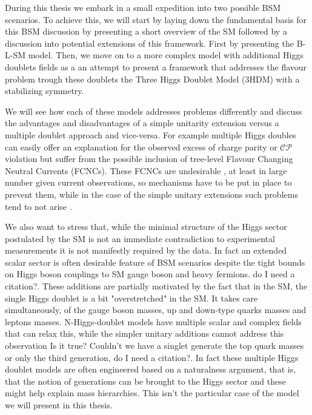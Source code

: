 During this thesis we embark in a small expedition into two possible BSM scenarios.
%
To achieve this, we will start by laying down the fundamental basis for this BSM discussion by presenting a short overview of the SM followed by a discussion into potential extensions of this framework. First by presenting the B-L-SM model. 
%
Then, we move on to a more complex model with additional Higgs doublets fields as
a an attempt to present a framework that addresses the flavour problem trough these doublets the Three Higgs Doublet Model (3HDM) with a stabilizing symmetry.

We will see how each of these models addresses problems differently and discuss the advantages and disadvantages of a simple unitarity extension versus a multiple doublet approach and vice-versa. 
%
For example multiple Higgs doubles can easily offer an explanation for the observed excess of charge parity or $\mathcal{CP}$ violation but suffer from the possible inclusion of tree-level Flavour Changing Neutral Currents (FCNCs). These FCNCs are undesirable \cite{ILYUSHIN2020114921}, at least in large number given current observations, so mechanisms have to be put in place to prevent them, while in the case of the simple unitary extensions such problems tend to not arise \cite{Huitu2019}. 

We also want to stress that, while the minimal structure of the Higgs sector postulated by the SM is not an immediate contradiction to experimental measurements it is not manifestly required by the data. 
%
In fact an extended scalar sector is often desirable feature of BSM scenarios despite the tight bounds on Higgs boson couplings to SM gauge boson and heavy fermions. {\color{red} do I need a citation?}.   
%
These additions are partially motivated by the fact that in the SM, the single Higgs doublet is a bit "overstretched" in the SM.  It  takes  care  simultaneously, of the gauge boson masses, up and down-type quarks masses and leptons masses. 
%
N-Higgs-doublet models have multiple scalar and complex fields that can relax this, while the simpler unitary additions cannot address this observation {\color{red} Is it true? Couldn't we have a singlet generate the top quark masses or only the third generation, do I need a citation?}.   
%
In fact these multiple Higgs doublet models are often engineered based on a naturalness argument, that is, that the  notion  of  generations  can  be  brought  to  the  Higgs  sector and these might help explain mass hierarchies. This isn't the particular case of the model we will present in this thesis. 

